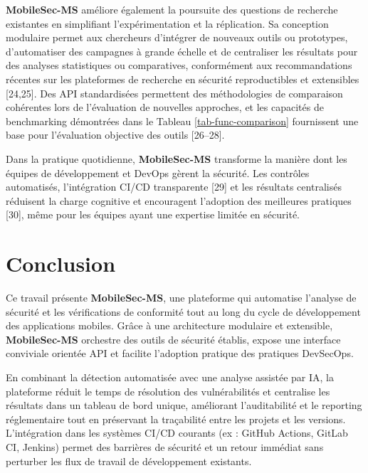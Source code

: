 \documentclass[
  journal=largetwo,
  manuscript=article-type,
  year=2025,
  volume=1,
]{cup-journal}
\begin{document}
\textbf{MobileSec-MS} améliore également la poursuite des questions de recherche existantes en simplifiant l'expérimentation et la réplication. Sa conception modulaire permet aux chercheurs d'intégrer de nouveaux outils ou prototypes, d'automatiser des campagnes à grande échelle et de centraliser les résultats pour des analyses statistiques ou comparatives, conformément aux recommandations récentes sur les plateformes de recherche en sécurité reproductibles et extensibles [24,25]. Des API standardisées permettent des méthodologies de comparaison cohérentes lors de l'évaluation de nouvelles approches, et les capacités de benchmarking démontrées dans le Tableau \ref{tab-func-comparison} fournissent une base pour l'évaluation objective des outils [26–28].

Dans la pratique quotidienne, \textbf{MobileSec-MS} transforme la manière dont les équipes de développement et DevOps gèrent la sécurité. Les contrôles automatisés, l'intégration CI/CD transparente [29] et les résultats centralisés réduisent la charge cognitive et encouragent l'adoption des meilleures pratiques [30], même pour les équipes ayant une expertise limitée en sécurité.

\section{Conclusion}
\label{sec-conclusion}

Ce travail présente \textbf{MobileSec-MS}, une plateforme qui automatise l'analyse de sécurité et les vérifications de conformité tout au long du cycle de développement des applications mobiles. Grâce à une architecture modulaire et extensible, \textbf{MobileSec-MS} orchestre des outils de sécurité établis, expose une interface conviviale orientée API et facilite l'adoption pratique des pratiques DevSecOps.

En combinant la détection automatisée avec une analyse assistée par IA, la plateforme réduit le temps de résolution des vulnérabilités et centralise les résultats dans un tableau de bord unique, améliorant l'auditabilité et le reporting réglementaire tout en préservant la traçabilité entre les projets et les versions. L'intégration dans les systèmes CI/CD courants (ex : GitHub Actions, GitLab CI, Jenkins) permet des barrières de sécurité et un retour immédiat sans perturber les flux de travail de développement existants.
\end{document}
